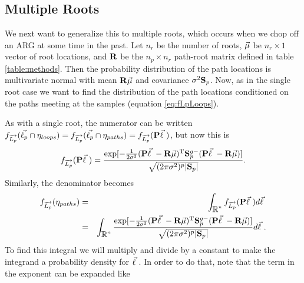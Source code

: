 \subsection{Multiple Roots}
\label{appendix:MultipleRoots}
We next want to generalize this to multiple roots, which occurs when we chop off an ARG at some time in the past. Let $n_r$ be the number of roots, $\vec{\mu}$ be $n_r \times 1$ vector of root locations, and $\mathbf{R}$ be the $n_p \times n_r$ path-root matrix defined in table \ref{table:methods}.
Then the probability distribution of the path locations is multivariate normal with mean $\mathbf{R}\vec{\mu}$ and covariance $\sigma^2\mathbf{S}_p$.
Now, as in the single root case we want to find the  distribution of the path locations conditioned on the paths meeting at the samples (equation \ref{eq:fLpLoops}). 

As with a single root, the numerator can be written $f_{\overrightarrow{L_p}}(\vec{\ell_p} \cap \eta_{loops}) = f_{\overrightarrow{L_p}}(\vec{\ell_p} \cap \eta_{paths}) = f_{\overrightarrow{L_p}}(\mathbf{P} \vec{\ell} \ )$, but now this is
\begin{eqnarray}
\label{eq:numeration_multipleroots}
    f_{\overrightarrow{L_p}}(\mathbf{P} \vec{\ell} \ ) = \frac{\exp[-\frac{1}{2\sigma^2}(\mathbf{P} \vec{\ell} \  - \mathbf{R}\vec{\mu})^{\text{T}}\mathbf{S}_p^{g-}(\mathbf{P} \vec{\ell} \  - \mathbf{R}\vec{\mu})]}{\sqrt{(2\pi\sigma^2)^p|\mathbf{S}_p|}}.
\end{eqnarray}
Similarly, the denominator becomes
\begin{eqnarray}
    f_{\overrightarrow{L_p}}(\eta_{paths}) &=& \displaystyle \int_{\mbox{${\mathbb R}$}^n} f_{\overrightarrow{L_p}} (\mathbf{P} \vec{\ell} \ ) d\vec{\ell} \  \\
    &=& \displaystyle \int_{\mbox{${\mathbb R}$}^n} \frac{\exp[-\frac{1}{2\sigma^2}(\mathbf{P} \vec{\ell} \  - \mathbf{R}\vec{\mu})^{\text{T}}\mathbf{S}_p^{g-}(\mathbf{P} \vec{\ell} \  - \mathbf{R}\vec{\mu})]}{\sqrt{(2\pi\sigma^2)^p|\mathbf{S}_p|}}  d\vec{\ell} \ .
\end{eqnarray}
To find this integral we will multiply and divide by a constant to make the integrand a probability density for $\vec{\ell} \ $. In order to do that, note that the term in the exponent can be expanded like
